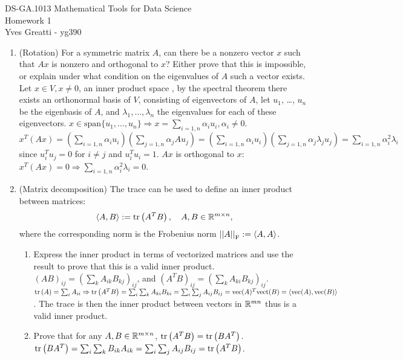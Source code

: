 \documentclass[12pt,twoside]{article}
\begin{document}
\noindent DS-GA.1013 Mathematical Tools for Data Science \\
Homework 1 \\
Yves Greatti - yg390\\


\begin{enumerate}
\item (Rotation) For a symmetric matrix $A$, can there be a nonzero vector $x$ such that $Ax$ is nonzero and orthogonal to $x$? Either prove that this is impossible, or explain under what condition on the eigenvalues of $A$ such a vector exists.
Let $x \in V, x \neq 0$, an inner product space , by the spectral theorem there exists an orthonormal basis of  $V$, consisting of eigenvectors of $A$, let $u_1$, \ldots, $u_n$ be the eigenbasis of $A$, and $\lambda_1, \ldots, \lambda_n$ the eigenvalues for each of these eigenvectors.
$x \in \text{span}\{u_1, \ldots, u_n \} \Rightarrow  x=\sum_{i=1,n} \alpha_i u_i, \alpha_i \neq 0$.  $x^T (Ax) = (\sum_{i=1,n} \alpha_i u_i) (\sum_{j=1,n} \alpha_j A u_j) =  (\sum_{i=1,n} \alpha_i u_i) (\sum_{j=1,n} \alpha_j \lambda_j u_j) = \sum_{i=1,n} \alpha_i^2 \lambda_i$ since $u_i^T u_j = 0$ for $i \neq j$ and $u_i^T u_i =1$. $Ax$ is orthogonal to $x$: $x^T (Ax) = 0 \Rightarrow  \sum_{i=1,n} \alpha_i^2 \lambda_i = 0$.

\item (Matrix decomposition) The trace can be used to define an inner product between matrices:
\begin{align}
\left \langle A, B\right \rangle := \operatorname{tr}\left( A^TB \right), \quad A,B \in \mathbb{R}^{m \times n},
\end{align}
where the corresponding norm is the Frobenius norm $\left|\left| A \right|\right| _{\operatorname{F}}:=\left \langle A, A\right \rangle$.
\begin{enumerate}
\item Express the inner product in terms of vectorized matrices and use the result to prove that this is a valid inner product.
$(A B)_{ij} = (\sum_k A_{ik} B_{kj})_{ij}$, and $(A^TB) _{ij} = (\sum_k A_{ki} B_{kj})_{ij}$.
$\operatorname{tr}\left( A \right) = \sum_i A_{ii}  \Rightarrow \operatorname{tr}\left( A^TB \right) = \sum_i \sum_k A_{ki} B_{ki} = \sum_i \sum_j A_{ij} B_{ij} = \text{vec}(A)^T \text{vect}(B) = \left \langle \text{vec}(A), \text{vec}(B)\right \rangle$.
The trace is then the inner product between vectors in $\mathbb{R}^{mn}$ thus is a valid inner product.

\item Prove that for any $A,B \in \mathbb{R}^{m \times n}$, $\operatorname{tr}\left( A^TB \right)=\operatorname{tr}\left( BA^T \right)$.
$\operatorname{tr}\left( BA^T \right) =  \sum_i \sum_k B_{ik} A_{ik} =  \sum_i \sum_j A_{ij} B_{ij} =  \operatorname{tr}\left( A^TB \right)$.


\end{enumerate}
\end{enumerate}
\end{document}

